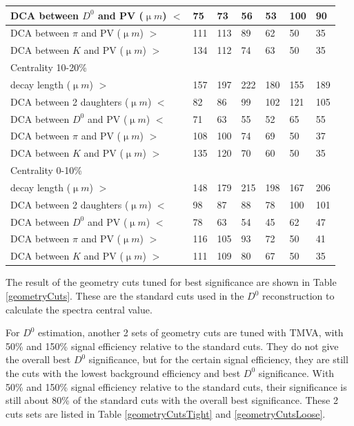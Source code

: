 \begin{table}[htp]
\begin{center}
\begin{tabular}{l|l|l|l|l|l|l}
      DCA between $D^0$ and PV (${\upmu}m$) $<$ & 75 & 73 & 56 & 53 & 100 & 90\\ \hline
      DCA between $\pi$ and PV (${\upmu}m$) $>$ & 111 & 113 & 89 & 62 & 50 & 35\\ \hline
      DCA between $K$ and PV (${\upmu}m$) $>$ & 134 & 112 & 74 & 63 & 50 & 35\\ \hline
      Centrality  10-20\% &  &  &  &  & & \\ \hline
      decay length (${\upmu}m$) $>$ & 157 & 197 & 222 & 180 & 155 & 189\\ \hline
      DCA between 2 daughters (${\upmu}m$) $<$ & 82 & 86 & 99 & 102 & 121 & 105\\ \hline
      DCA between $D^0$ and PV (${\upmu}m$) $<$ & 71 & 63 & 55 & 52 & 65 & 55\\ \hline
      DCA between $\pi$ and PV (${\upmu}m$) $>$ & 108 & 100 & 74 & 69 & 50 & 37\\ \hline
      DCA between $K$ and PV (${\upmu}m$) $>$ & 135 & 120 & 70 & 60 & 50 & 35\\ \hline
      Centrality  0-10\% &  &  &  &  & & \\ \hline
      decay length (${\upmu}m$) $>$ & 148 & 179 & 215 & 198 & 167 & 206\\ \hline
      DCA between 2 daughters (${\upmu}m$) $<$ & 98 & 87 & 88 & 78 & 100 & 101\\ \hline
      DCA between $D^0$ and PV (${\upmu}m$) $<$ & 78 & 63 & 54 & 45 & 62 & 47\\ \hline
      DCA between $\pi$ and PV (${\upmu}m$) $>$ & 116 & 105 & 93 & 72 & 50 & 41\\ \hline
      DCA between $K$ and PV (${\upmu}m$) $>$ & 111 & 109 & 80 & 67 & 50 & 35\\ \hline
    \end{tabular}
  \end{center}
\end{table}

The result of the geometry cuts tuned for best significance are shown in Table \ref{geometryCuts}. These are the standard cuts used in the $D^0$ reconstruction to calculate the spectra central value.

For $D^0$ estimation, another 2 sets of geometry cuts are tuned with TMVA, with 50\% and 150\% signal efficiency relative to the standard cuts. They do not give the overall best $D^0$ significance, but for the certain signal efficiency, they are still the cuts with the lowest background efficiency and best $D^0$ significance. With 50\% and 150\% signal efficiency relative to the standard cuts, their significance is still about 80\% of the standard cuts with the overall best significance. These 2 cuts sets are listed in Table \ref{geometryCutsTight} and \ref{geometryCutsLoose}.

